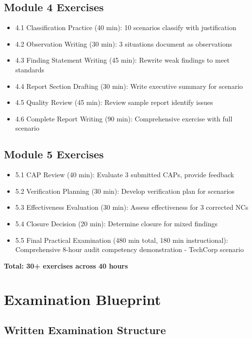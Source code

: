 \documentclass[11pt,a4paper]{article}
\begin{document}
\subsection{Module 4 Exercises}
\begin{itemize}
\item 4.1 Classification Practice (40 min): 10 scenarios classify with justification
\item 4.2 Observation Writing (30 min): 3 situations document as observations
\item 4.3 Finding Statement Writing (45 min): Rewrite weak findings to meet standards
\item 4.4 Report Section Drafting (30 min): Write executive summary for scenario
\item 4.5 Quality Review (45 min): Review sample report identify issues
\item 4.6 Complete Report Writing (90 min): Comprehensive exercise with full scenario
\end{itemize}

\subsection{Module 5 Exercises}
\begin{itemize}
\item 5.1 CAP Review (40 min): Evaluate 3 submitted CAPs, provide feedback
\item 5.2 Verification Planning (30 min): Develop verification plan for scenarios
\item 5.3 Effectiveness Evaluation (30 min): Assess effectiveness for 3 corrected NCs
\item 5.4 Closure Decision (20 min): Determine closure for mixed findings
\item 5.5 Final Practical Examination (480 min total, 180 min instructional): Comprehensive 8-hour audit competency demonstration - TechCorp scenario
\end{itemize}

\textbf{Total: 30+ exercises across 40 hours}

\section{Examination Blueprint}

\subsection{Written Examination Structure}
\end{document}
